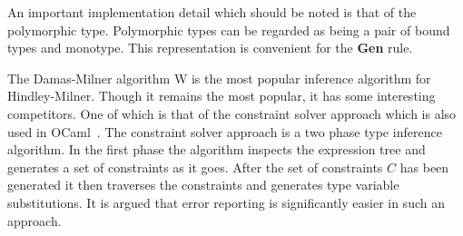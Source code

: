 \documentclass[11pt,oneside,a4paper]{report}
\begin{document}
An important implementation detail which should be noted is that of the polymorphic type.
Polymorphic types can be regarded as being a pair of bound types and monotype.
This representation is convenient for the \textbf{Gen} rule.
\begin{remark}
    The Damas-Milner algorithm W is the most popular inference algorithm for Hindley-Milner.
    Though it remains the most popular, it has some interesting competitors.
    One of which is that of the constraint solver approach which is also used in OCaml~\cite{heeren2002generalizing}.
    The constraint solver approach is a two phase type inference algorithm.
    In the first phase the algorithm inspects the expression tree and generates a set of constraints as it goes.
    After the set of constraints $C$ has been generated it then traverses the constraints and generates type variable substitutions.
    It is argued that error reporting is significantly easier in such an approach.
\end{remark}
\end{document}
